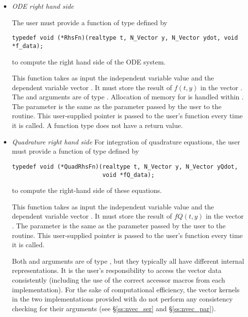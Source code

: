 \begin{itemize}
%
%
\item {\em ODE right hand side}

  The user must provide a function of type  defined by
\begin{verbatim}
typedef void (*RhsFn)(realtype t, N_Vector y, N_Vector ydot, void *f_data);
\end{verbatim}
  to compute the right hand side of the ODE system.
  
  This function takes as input the independent variable  
  value  and the dependent variable vector .  It must store the    
  result of $f(t,y)$ in the vector .  The  and  arguments 
  are of type . Allocation of memory for  is handled within {\cvodes}.
  The  parameter is the same as the  parameter passed by 
  the user to the  routine. This user-supplied pointer is passed to 
  the user's  function every time it is called.                                       
  A  function type does not have a return value.                        
%
%
\item {\em Quadrature right hand side}
   For integration of quadrature equations, the user must provide a function of
   type  defined by
\begin{verbatim}
typedef void (*QuadRhsFn)(realtype t, N_Vector y, N_Vector yQdot, 
                          void *fQ_data);
\end{verbatim}
   to compute the right-hand side of these equations.

   This function takes as input the independent variable value 
   and the dependent variable vector . It must store the
   result of $fQ(t,y)$ in the vector . 
   The  parameter is the same as the  parameter passed by 
   the user to the  routine. This user-supplied pointer is passed to 
   the user's  function every time it is called.
   
   Both  and  arguments are of type ,
   but they  typically all have different internal representations. It is the user's 
   responsibility to access the vector data consistently (including the use of the 
   correct accessor macros from each {\nvector} implementation). For the sake of 
   computational efficiency, the vector kernels in the two {\nvector} implementations 
   provided with {\cvodes} do not perform any consistency checking for their 
    arguments (see \S\ref{ss:nvec_ser} and \S\ref{ss:nvec_par}).


\end{itemize}

